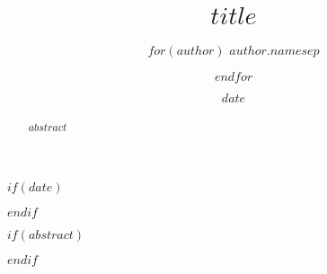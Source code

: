 %

\title{$title$}
\author{%
    $for(author)$
    $author.name$$sep$ \and
    $endfor$
}

$if(date)$
\date{$date$}
$endif$

$if(abstract)$
\begin{abstract}
    $abstract$
\end{abstract}
$endif$
